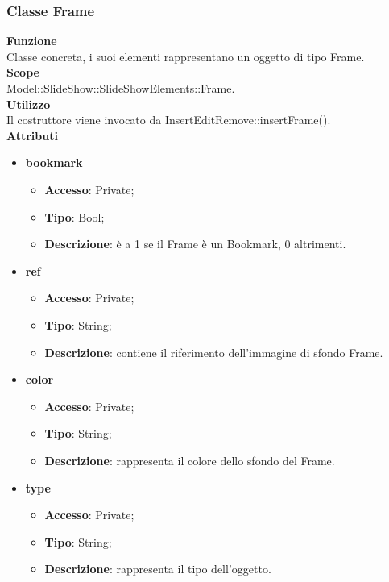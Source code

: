 {	\subsubsection{Classe Frame}{
		\label{Frame}
		\textbf{Funzione}\\
			\indent Classe concreta, i suoi elementi rappresentano un oggetto di tipo Frame.\\
	   	\textbf{Scope}\\
			\indent Model::SlideShow::SlideShowElements::Frame.\\
		\textbf{Utilizzo}\\
			\indent Il costruttore viene invocato da InsertEditRemove::insertFrame().\\
		\textbf{Attributi}
		\begin{itemize}
			\item \textbf{bookmark}
			\begin{itemize}
				\item \textbf{Accesso}: Private;
				\item \textbf{Tipo}: Bool;
				\item \textbf{Descrizione}: è a 1 se il Frame\ped{g} è un Bookmark, 0 altrimenti.
			\end{itemize}
			\item \textbf{ref}
			\begin{itemize}
				\item \textbf{Accesso}: Private;
				\item \textbf{Tipo}: String;
				\item \textbf{Descrizione}: contiene il riferimento dell’immagine di sfondo Frame.
			\end{itemize}
			\item \textbf{color}
			\begin{itemize}
				\item \textbf{Accesso}: Private;
				\item \textbf{Tipo}: String;
				\item \textbf{Descrizione}: rappresenta il colore dello sfondo del Frame.
			\end{itemize}
			\item \textbf{type}
			\begin{itemize}
				\item \textbf{Accesso}: Private;
				\item \textbf{Tipo}: String;
				\item \textbf{Descrizione}: rappresenta il tipo dell'oggetto.
			\end{itemize}
		\end{itemize}
		}
}
